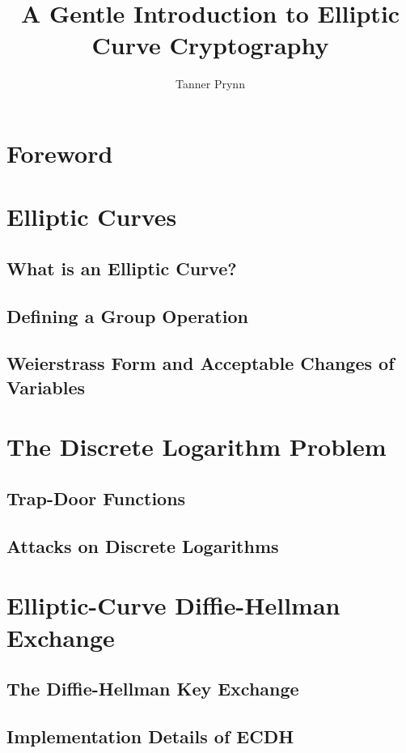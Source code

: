 \documentclass{article}
\begin{document}
\title{A Gentle Introduction to Elliptic Curve Cryptography}
\author{Tanner Prynn}
\maketitle

\tableofcontents

\section*{Foreword}

\section{Elliptic Curves}

\subsection{What is an Elliptic Curve?}

\subsection{Defining a Group Operation}

\subsection{Weierstrass Form and Acceptable Changes of Variables}

\section{The Discrete Logarithm Problem}

\subsection{Trap-Door Functions}

\subsection{Attacks on Discrete Logarithms}

\section{Elliptic-Curve Diffie-Hellman Exchange}

\subsection{The Diffie-Hellman Key Exchange}

\subsection{Implementation Details of ECDH}

\begin{thebibliography}{9}


\end{thebibliography}
\end{document}
